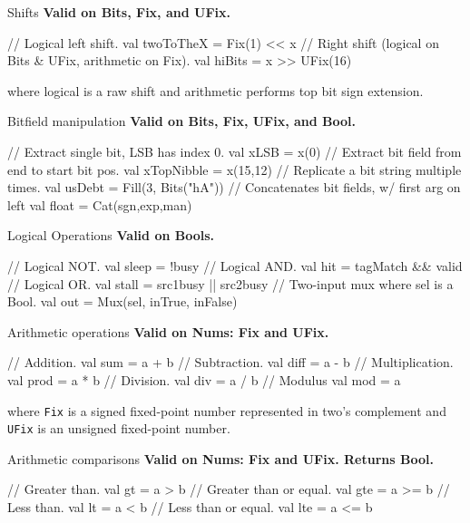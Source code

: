 \documentclass[xcolor=pdflatex,dvipsnames,table]{beamer}
\begin{document}
\begin{frame}[fragile]{Shifts}
\textbf{Valid on Bits, Fix, and UFix.}
\begin{scala}
// Logical left shift.
val twoToTheX = Fix(1) << x   
// Right shift (logical on Bits & UFix, arithmetic on Fix).
val hiBits    = x >> UFix(16) 
\end{scala}
\noindent
where logical is a raw shift and arithmetic performs top bit sign extension.
\end{frame}

\begin{frame}[fragile]{Bitfield manipulation}
\textbf{Valid on Bits, Fix, UFix, and Bool.}
\begin{scala}
// Extract single bit, LSB has index 0.
val xLSB       = x(0)                
// Extract bit field  from end to start bit pos. 
val xTopNibble = x(15,12)            
// Replicate a bit string multiple times.
val usDebt     = Fill(3, Bits("hA")) 
// Concatenates bit fields, w/ first arg on left
val float      = Cat(sgn,exp,man)    
\end{scala}
\end{frame}

\begin{frame}[fragile]{Logical Operations}
\textbf{Valid on Bools. }
\begin{scala}
// Logical NOT. 
val sleep = !busy                     
// Logical AND.
val hit   = tagMatch && valid         
// Logical OR.
val stall = src1busy || src2busy      
// Two-input mux where sel is a Bool.  
val out   = Mux(sel, inTrue, inFalse) 
\end{scala}
\end{frame}

\begin{frame}[fragile]{Arithmetic operations}
\textbf{Valid on Nums: Fix and UFix. }
\begin{scala}
// Addition. 
val sum  = a + b  
// Subtraction.
val diff = a - b  
// Multiplication. 
val prod = a * b  
// Division.
val div  = a / b  
// Modulus
val mod  = a %
\end{scala}
\noindent
where \verb+Fix+ is a signed fixed-point number represented in two's complement and \verb+UFix+ is an unsigned fixed-point number. 
\end{frame}

\begin{frame}[fragile]{Arithmetic comparisons}
\textbf{Valid on Nums: Fix and UFix. Returns Bool.}
\begin{scala}
// Greater than.
val gt  = a > b   
// Greater than or equal.
val gte = a >= b  
// Less than.
val lt  = a < b   
// Less than or equal.
val lte = a <= b  
\end{scala}
\end{frame}
\end{document}
